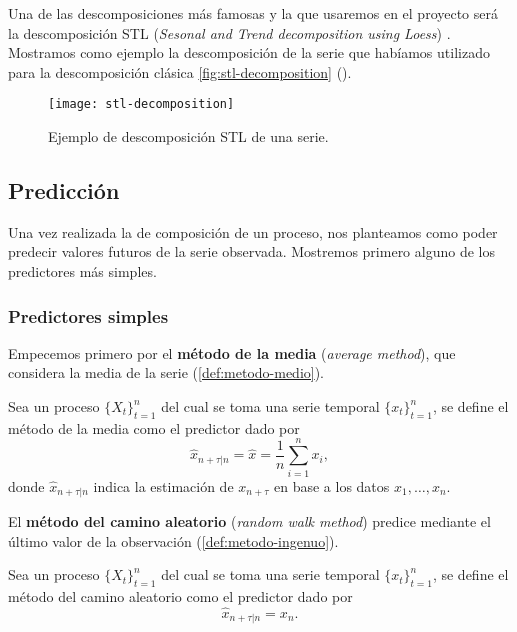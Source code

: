 Una de las descomposiciones más famosas y la que usaremos en el proyecto será la descomposición STL (\emph{Sesonal and Trend decomposition using Loess}) \cite{cleveland1990stl}. Mostramos como ejemplo la descomposición de la serie que habíamos utilizado para la descomposición clásica \autoref{fig:stl-decomposition} (\cite{hyndman2018forecasting}).

\begin{figure}[htpb]
  \centering
  \texttt{[image: stl-decomposition]}
  \caption{Ejemplo de descomposición STL de una serie.}
  \label{fig:stl-decomposition}
\end{figure}

\subsection{Predicción}

Una vez realizada la de composición de un proceso, nos planteamos como poder predecir valores futuros de la serie observada. Mostremos primero alguno de los predictores más simples.

\subsubsection{Predictores simples}

Empecemos primero por el \textbf{método de la media} (\emph{average method}), que considera la media de la serie (\autoref{def:metodo-medio}).

\begin{definicion}
  Sea un proceso $\{X_t\}_{t = 1}^n$ del cual se toma una serie temporal $\{x_t\}_{t = 1}^n$, se define el método de la media como el predictor dado por
  $$\hat{x}_{n + \tau | n} = \hat{x} = \dfrac{1}{n}\sum \limits^n_{i = 1} x_i, $$
  donde $\hat{x}_{n + \tau | n}$ indica la estimación de $x_{n + \tau}$ en base a los datos $x_1, \ldots, x_n$.
  \label{def:metodo-medio}
\end{definicion}

El \textbf{método del camino aleatorio} (\emph{random walk method}) predice mediante el último valor de la observación (\autoref{def:metodo-ingenuo}).

\begin{definicion}
  Sea un proceso $\{X_t\}_{t = 1}^n$ del cual se toma una serie temporal $\{x_t\}_{t = 1}^n$, se define el método del camino aleatorio como el predictor dado por
  $$\hat{x}_{n + \tau | n} = x_n.$$
  \label{def:metodo-ingenuo}
\end{definicion}

